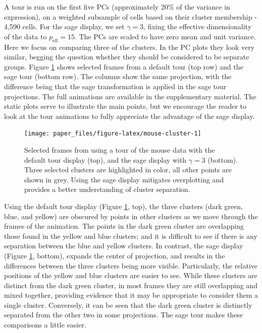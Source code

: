 \documentclass[]{interact}
\theoremstyle{plain}%
\theoremstyle{definition}
\theoremstyle{remark}
\begin{document}
A tour is run on the first five PCs (approximately 20\% of the variance
in expression), on a weighted subsample of cells based on their cluster
membership - 4,590 cells. For the sage display, we set \(\gamma = 3\),
fixing the effective dimensionality of the data to
\(p_{\mathrm{eff}} = 15\). The PCs are scaled to have zero mean and unit
variance. Here we focus on comparing three of the clusters. In the PC
plots they look very similar, begging the question whether they should
be considered to be separate groups. Figure \ref{fig:mouse-cluster}
shows selected frames from a default tour (top row) and the sage tour
(bottom row). The columns show the same projection, with the difference
being that the sage transformation is applied in the sage tour
projections. The full animations are available in the supplementary
material. The static plots serve to illustrate the main points, but we
encourage the reader to look at the tour animations to fully appreciate
the advantage of the sage display.

\begin{figure}

{\centering \texttt{[image: paper\_files/figure-latex/mouse-cluster-1]} 

}

\caption{Selected frames from using a tour of the mouse data with the default tour display (top), and the sage display with $\gamma=3$ (bottom). Three selected clusters are highlighted in color, all other points are shown in grey. Using the sage display mitigates overplotting and provides a better understanding of cluster separation.}\label{fig:mouse-cluster}
\end{figure}

Using the default tour display (Figure \ref{fig:mouse-cluster}, top),
the three clusters (dark green, blue, and yellow) are obscured by points
in other clusters as we move through the frames of the animation. The
points in the dark green cluster are overlapping those found in the
yellow and blue clusters; and it is difficult to see if there is any
separation between the blue and yellow clusters. In contrast, the sage
display (Figure \ref{fig:mouse-cluster}, bottom), expands the center of
projection, and results in the differences between the three clusters
being more visible. Particularly, the relative positions of the yellow
and blue clusters are easier to see. While these clusters are distinct
from the dark green cluster, in most frames they are still overlapping
and mixed together, providing evidence that it may be appropriate to
consider them a single cluster. Conversely, it can be seen that the dark
green cluster is distinctly separated from the other two in some
projections. The sage tour makes these comparisons a little easier.
\end{document}
